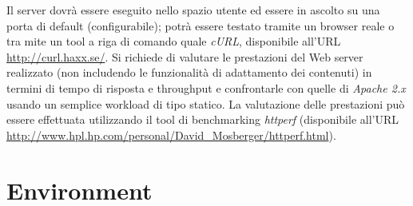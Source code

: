 \documentclass[paper=a4, oneside, fontsize=14pt, titlepage]{article}
\begin{document}
\begin{flushleft}
		Il server dovrà essere eseguito nello spazio utente ed essere in ascolto su una porta di default (configurabile); potrà essere testato tramite un browser reale o tra mite un tool a riga di comando quale \textit{cURL}, disponibile all’URL \url{http://curl.haxx.se/}.
		Si richiede di valutare le prestazioni del Web server realizzato (non includendo le funzionalità  di adattamento dei contenuti) in termini di tempo di risposta e throughput e confrontarle con quelle di \textit{Apache 2.x} usando un semplice workload di tipo statico. La valutazione delle prestazioni può essere effettuata utilizzando il tool di benchmarking \textit{httperf} (disponibile all’URL \url{http://www.hpl.hp.com/personal/David\_Mosberger/httperf.html}).
	\end{flushleft}
	
	\section{Environment}
\end{document}
